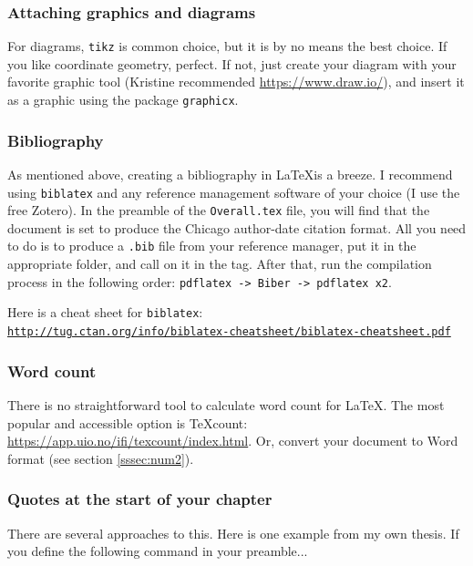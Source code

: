 \documentclass[12pt, letterpaper]{article}
\begin{document}
\subsubsection{Attaching graphics and diagrams} \label{sssec:num1}
For diagrams, \verb|tikz| is common choice, but it is by no means the best choice. If you like coordinate geometry, perfect. If not, just create your diagram with your favorite graphic tool (Kristine recommended \href{https://www.draw.io/}{https://www.draw.io/}), and insert it as a graphic using the package \verb|graphicx|.

\subsubsection{Bibliography}
As mentioned above, creating a bibliography in \LaTeX is a breeze. I recommend using \verb|biblatex| and any reference management software of your choice (I use the free Zotero). In the preamble of the \verb|Overall.tex| file, you will find that the document is set to produce the Chicago author-date citation format. All you need to do is to produce a \verb|.bib| file from your reference manager, put it in the appropriate folder, and call on it in the \verb|| tag. After that, run the compilation process in the following order: \verb|pdflatex -> Biber -> pdflatex x2|. 

Here is a cheat sheet for \verb|biblatex|: \\
\href{http://tug.ctan.org/info/biblatex-cheatsheet/biblatex-cheatsheet.pdf}{\nolinkurl{http://tug.ctan.org/info/biblatex-cheatsheet/biblatex-cheatsheet.pdf}}

\subsubsection{Word count}
There is no straightforward tool to calculate word count for LaTeX. The most popular and accessible option is TeXcount: \href{https://app.uio.no/ifi/texcount/index.html}{https://app.uio.no/ifi/texcount/index.html}. Or, convert your document to Word format (see section \ref{sssec:num2}).

\subsubsection{Quotes at the start of your chapter}
There are several approaches to this. Here is one example from my own thesis. If you define the following command in your preamble...
\end{document}
